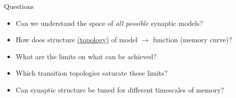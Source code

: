 \documentclass{beamer}%
\newcommand{\M}{\mathbf{M}}
\newcommand{\pot}{^{\text{pot}}}
\newcommand{\dep}{^{\text{dep}}}
\newcommand{\potdep}{^{\text{pot/dep}}}
\begin{document}

\begin{frame}[label=fr_questions]{Questions}
%
 \begin{itemize}
   \item Can we understand the space of \emph{all possible} synaptic models?
   \item How does structure \hyperlink{fr_net<1>}{(topology)} of model $\to$ function (memory curve)?
   \item What are the limits on what can be achieved?
   \item Which transition topologies saturate these limits?
   \item Can synaptic structure be tuned for different timescales of memory?
 \end{itemize}
%
\end{frame}

%
%
\end{document}
